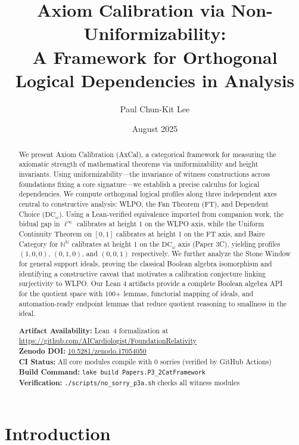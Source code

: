\documentclass[11pt]{article}
\title{Axiom Calibration via Non-Uniformizability:\\
A Framework for Orthogonal Logical Dependencies in Analysis}
\author{Paul Chun-Kit Lee}
\date{August 2025}
\newcommand{\N}{\mathbb{N}}
\newcommand{\DCw}{\mathrm{DC}_\omega}
\newcommand{\linf}{\ell^\infty}
\begin{document}
\maketitle

\begin{abstract}
We present Axiom Calibration (AxCal), a categorical framework for measuring the axiomatic strength of mathematical theorems via uniformizability and height invariants. Using uniformizability—the invariance of witness constructions across foundations fixing a core signature—we establish a precise calculus for logical dependencies. We compute orthogonal logical profiles along three independent axes central to constructive analysis: WLPO, the Fan Theorem (FT), and Dependent Choice ($\DCw$). Using a Lean-verified equivalence imported from companion work, the bidual gap in $\linf$ calibrates at height 1 on the WLPO axis, while the Uniform Continuity Theorem on $[0,1]$ calibrates at height 1 on the FT axis, and Baire Category for $\N^\N$ calibrates at height 1 on the $\DCw$ axis (Paper 3C), yielding profiles $(1,0,0)$, $(0,1,0)$, and $(0,0,1)$ respectively. We further analyze the Stone Window for general support ideals, proving the classical Boolean algebra isomorphism and identifying a constructive caveat that motivates a calibration conjecture linking surjectivity to WLPO. Our Lean 4 artifacts provide a complete Boolean algebra API for the quotient space with 100+ lemmas, functorial mapping of ideals, and automation-ready endpoint lemmas that reduce quotient reasoning to smallness in the ideal.

\vspace{1em}
\noindent\textbf{Artifact Availability:} Lean~4 formalization at \url{https://github.com/AICardiologist/FoundationRelativity}\\
\textbf{Zenodo DOI:} \href{https://doi.org/10.5281/zenodo.17054050}{10.5281/zenodo.17054050}\\
\textbf{CI Status:} All core modules compile with 0 sorries (verified by GitHub Actions)\\
\textbf{Build Command:} \texttt{lake build Papers.P3\_2CatFramework}\\
\textbf{Verification:} \texttt{./scripts/no\_sorry\_p3a.sh} checks all witness modules
\end{abstract}

\tableofcontents

\section{Introduction}
\end{document}
